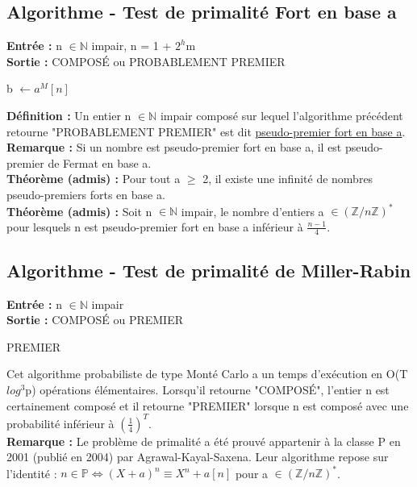 \documentclass[12pt,a4paper]{article}
\begin{document}
\subsection{Algorithme - Test de primalité Fort en base a}
\textbf{Entrée :} n $\in \mathbb{N}$ impair, n = 1 + $2^h$m\\
\textbf{Sortie :} COMPOSÉ ou PROBABLEMENT PREMIER\\
\begin{algorithm}[H]
	b $\gets a^M[n]$\\
\end{algorithm}
\textbf{Définition :} Un entier n $\in \mathbb{N}$ impair composé sur lequel l'algorithme précédent retourne "PROBABLEMENT PREMIER" est dit \underline{pseudo-premier fort en base a}.\\
\textbf{Remarque :} Si un nombre est pseudo-premier fort en base a, il est pseudo-premier de Fermat en base a.\\
\textbf{Théorème (admis) :} Pour tout a $\geq$ 2, il existe une infinité de nombres pseudo-premiers forts en base a.\\
\textbf{Théorème (admis) :} Soit n $\in \mathbb{N}$ impair, le nombre d'entiers a $\in (\mathbb{Z}/n\mathbb{Z})^*$ pour lesquels n est pseudo-premier fort en base a inférieur à $\frac{n - 1}{4}$.
\subsection{Algorithme - Test de primalité de Miller-Rabin}
\textbf{Entrée :} n $\in \mathbb{N}$ impair\\
\textbf{Sortie :} COMPOSÉ ou PREMIER\\
\begin{algorithm}[H]
	\Return PREMIER
\end{algorithm}
Cet algorithme probabiliste de type Monté Carlo a un temps d'exécution en O(T$log^3$p) opérations élémentaires. Lorsqu'il retourne "COMPOSÉ", l'entier n est certainement composé et il retourne "PREMIER" lorsque n est composé avec une probabilité inférieur à $(\frac{1}{4})^T$.\\
\textbf{Remarque :} Le problème de primalité a été prouvé appartenir à la classe P en 2001 (publié en 2004) par Agrawal-Kayal-Saxena. Leur algorithme repose sur l'identité : $n \in \mathbb{P} \Longleftrightarrow (X + a)^n \equiv X^n + a [n]$ pour a $\in (\mathbb{Z}/n\mathbb{Z})^*$.
\end{document}
